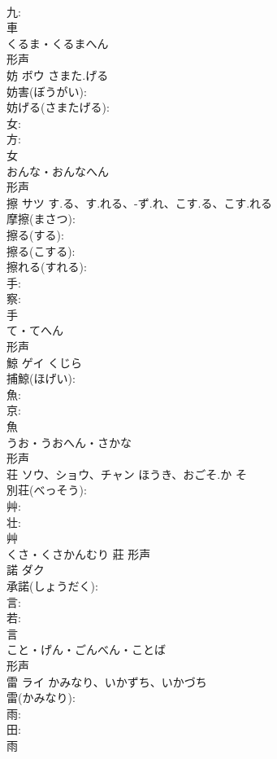 \documentclass[8pt]{extreport}
\begin{document}
\begin{CJK}{UTF8}{min}
\\	九: 
\\	車	
\\	くるま・くるまへん	
\\	形声 
\\	妨	ボウ	さまた.げる		
\\	妨害(ぼうがい): 
\\	妨げる(さまたげる): 
\\	女: 
\\	方: 
\\	女	
\\	おんな・おんなへん	
\\	形声 
\\	擦	サツ	す.る、す.れる、-ず.れ、こす.る、こす.れる		
\\	摩擦(まさつ): 
\\	擦る(する): 
\\	擦る(こする): 
\\	擦れる(すれる): 
\\	手: 
\\	察: 
\\	手	
\\	て・てへん	
\\	形声 
\\	鯨	ゲイ	くじら		
\\	捕鯨(ほげい): 
\\	魚: 
\\	京: 
\\	魚	
\\	うお・うおへん・さかな	
\\	形声 
\\	荘	ソウ、ショウ、チャン	ほうき、おごそ.か	そ	
\\	別荘(べっそう): 
\\	艸: 
\\	壮: 
\\	艸	
\\	くさ・くさかんむり	莊	形声 
\\	諾	ダク			
\\	承諾(しょうだく): 
\\	言: 
\\	若: 
\\	言	
\\	こと・げん・ごんべん・ことば	
\\	形声 
\\	雷	ライ	かみなり、いかずち、いかづち		
\\	雷(かみなり): 
\\	雨: 
\\	田: 
\\	雨	

\end{CJK}
\end{document}
